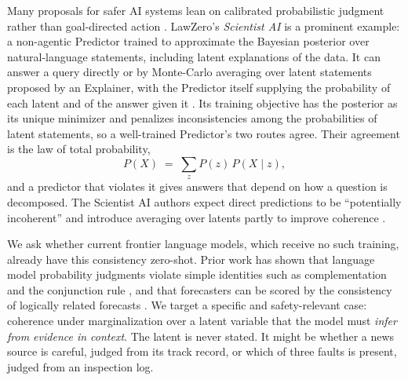 \documentclass[11pt]{article}
\begin{document}
Many proposals for safer AI systems lean on calibrated probabilistic judgment rather than goal-directed action \citep{armstrong2012oracle, drexler2019reframing, hubinger2023conditioning, dalrymple2024guaranteed, bengio2024oracle}. LawZero's \emph{Scientist AI} \citep{bengio2025scientist, bengio2026honesty} is a prominent example: a non-agentic Predictor trained to approximate the Bayesian posterior over natural-language statements, including latent explanations of the data. It can answer a query directly or by Monte-Carlo averaging over latent statements proposed by an Explainer, with the Predictor itself supplying the probability of each latent and of the answer given it \citep{bengio2026honesty}. Its training objective has the posterior as its unique minimizer and penalizes inconsistencies among the probabilities of latent statements, so a well-trained Predictor's two routes agree. Their agreement is the law of total probability,
\begin{equation}
P(X) \;=\; \sum_z P(z)\,P(X\mid z),
\label{eq:tp}
\end{equation}
and a predictor that violates it gives answers that depend on how a question is decomposed. The Scientist AI authors expect direct predictions to be ``potentially incoherent'' and introduce averaging over latents partly to improve coherence \citep{bengio2026honesty}.

We ask whether current frontier language models, which receive no such training, already have this consistency zero-shot. Prior work has shown that language model probability judgments violate simple identities such as complementation and the conjunction rule \citep{zhu2024incoherent}, and that forecasters can be scored by the consistency of logically related forecasts \citep{paleka2025consistency, fluri2023evaluating}. We target a specific and safety-relevant case: coherence under marginalization over a latent variable that the model must \emph{infer from evidence in context}. The latent is never stated. It might be whether a news source is careful, judged from its track record, or which of three faults is present, judged from an inspection log.
\end{document}
